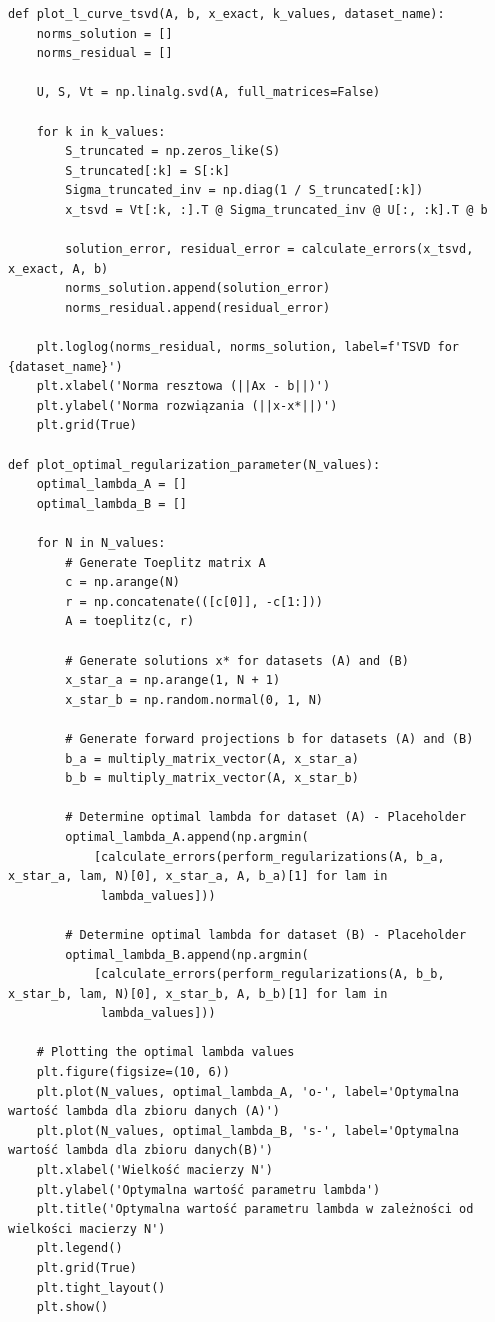 \documentclass{article}
\begin{document}
\begin{lstlisting}
def plot_l_curve_tsvd(A, b, x_exact, k_values, dataset_name):
    norms_solution = []
    norms_residual = []

    U, S, Vt = np.linalg.svd(A, full_matrices=False)

    for k in k_values:
        S_truncated = np.zeros_like(S)
        S_truncated[:k] = S[:k]
        Sigma_truncated_inv = np.diag(1 / S_truncated[:k])
        x_tsvd = Vt[:k, :].T @ Sigma_truncated_inv @ U[:, :k].T @ b

        solution_error, residual_error = calculate_errors(x_tsvd, x_exact, A, b)
        norms_solution.append(solution_error)
        norms_residual.append(residual_error)

    plt.loglog(norms_residual, norms_solution, label=f'TSVD for {dataset_name}')
    plt.xlabel('Norma resztowa (||Ax - b||)')
    plt.ylabel('Norma rozwiązania (||x-x*||)')
    plt.grid(True)

def plot_optimal_regularization_parameter(N_values):
    optimal_lambda_A = []
    optimal_lambda_B = []

    for N in N_values:
        # Generate Toeplitz matrix A
        c = np.arange(N)
        r = np.concatenate(([c[0]], -c[1:]))
        A = toeplitz(c, r)

        # Generate solutions x* for datasets (A) and (B)
        x_star_a = np.arange(1, N + 1)
        x_star_b = np.random.normal(0, 1, N)

        # Generate forward projections b for datasets (A) and (B)
        b_a = multiply_matrix_vector(A, x_star_a)
        b_b = multiply_matrix_vector(A, x_star_b)

        # Determine optimal lambda for dataset (A) - Placeholder
        optimal_lambda_A.append(np.argmin(
            [calculate_errors(perform_regularizations(A, b_a, x_star_a, lam, N)[0], x_star_a, A, b_a)[1] for lam in
             lambda_values]))

        # Determine optimal lambda for dataset (B) - Placeholder
        optimal_lambda_B.append(np.argmin(
            [calculate_errors(perform_regularizations(A, b_b, x_star_b, lam, N)[0], x_star_b, A, b_b)[1] for lam in
             lambda_values]))

    # Plotting the optimal lambda values
    plt.figure(figsize=(10, 6))
    plt.plot(N_values, optimal_lambda_A, 'o-', label='Optymalna wartość lambda dla zbioru danych (A)')
    plt.plot(N_values, optimal_lambda_B, 's-', label='Optymalna wartość lambda dla zbioru danych(B)')
    plt.xlabel('Wielkość macierzy N')
    plt.ylabel('Optymalna wartość parametru lambda')
    plt.title('Optymalna wartość parametru lambda w zależności od wielkości macierzy N')
    plt.legend()
    plt.grid(True)
    plt.tight_layout()
    plt.show()


\end{lstlisting}
\end{document}
